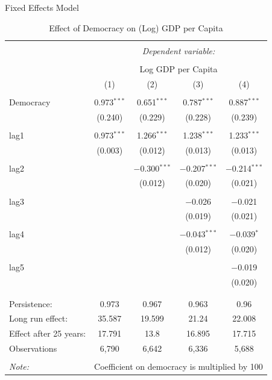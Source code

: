 \documentclass[
  ignorenonframetext,
]{beamer}
\begin{document}
\begin{frame}{Fixed Effects Model}
\protect\hypertarget{fixed-effects-model}{}
\tiny

\begin{table}[!htbp] \centering 
  \caption{Effect of Democracy on (Log) GDP per Capita} 
  \label{} 
\begin{tabular}{@{\extracolsep{0.1pt}}lcccc} 
\\[-1.8ex]\hline 
\hline \\[-1.8ex] 
 & \multicolumn{4}{c}{\textit{Dependent variable:}} \\ 
\cline{2-5} 
\\[-1.8ex] & \multicolumn{4}{c}{Log GDP per Capita} \\ 
 & (1) & (2) & (3) & (4) \\ 
\hline \\[-1.8ex] 
 Democracy & 0.973$^{***}$ & 0.651$^{***}$ & 0.787$^{***}$ & 0.887$^{***}$ \\ 
  & (0.240) & (0.229) & (0.228) & (0.239) \\ 
  & & & & \\ 
 lag1 & 0.973$^{***}$ & 1.266$^{***}$ & 1.238$^{***}$ & 1.233$^{***}$ \\ 
  & (0.003) & (0.012) & (0.013) & (0.013) \\ 
  & & & & \\ 
 lag2 &  & $-$0.300$^{***}$ & $-$0.207$^{***}$ & $-$0.214$^{***}$ \\ 
  &  & (0.012) & (0.020) & (0.021) \\ 
  & & & & \\ 
 lag3 &  &  & $-$0.026 & $-$0.021 \\ 
  &  &  & (0.019) & (0.021) \\ 
  & & & & \\ 
 lag4 &  &  & $-$0.043$^{***}$ & $-$0.039$^{*}$ \\ 
  &  &  & (0.012) & (0.020) \\ 
  & & & & \\ 
 lag5 &  &  &  & $-$0.019 \\ 
  &  &  &  & (0.020) \\ 
  & & & & \\ 
\hline \\[-1.8ex] 
Persistence:  & 0.973 & 0.967 & 0.963 & 0.96 \\ 
Long run effect:  & 35.587 & 19.599 & 21.24 & 22.008 \\ 
Effect after 25 years:  & 17.791 & 13.8 & 16.895 & 17.715 \\ 
Observations & 6,790 & 6,642 & 6,336 & 5,688 \\ 
\hline 
\hline \\[-1.8ex] 
\textit{Note:}  & \multicolumn{4}{r}{Coefficient on democracy is multiplied by 100} \\ 
\end{tabular} 
\end{table} 

\normalsize
\end{frame}
\end{document}
